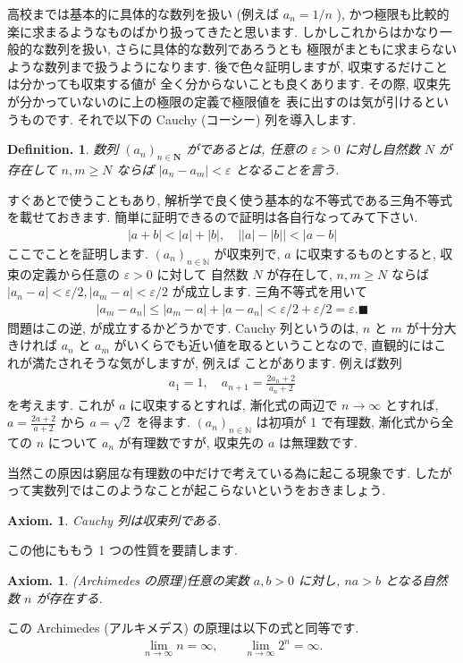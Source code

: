 \documentclass[openany, a4paper, oneside]{jsbook}
\theoremstyle{break}
\newtheorem{axm}[thm]{Axiom.}
\theoremstyle{breakdefn}
\newtheorem{defn}[thm]{Definition.}
\newcommand{\bN}{\mathbb{N}}
\newcommand{\vep}{\varepsilon}
\newcommand{\an}{(a_n)_{n{\in}{\bN}}}
\begin{document}
高校までは基本的に具体的な数列を扱い (例えば $a_n = 1/n$ ),
かつ極限も比較的楽に求まるようなものばかり扱ってきたと思います.
しかしこれからはかなり一般的な数列を扱い, さらに具体的な数列であろうとも
極限がまともに求まらないような数列まで扱うようになります.
後で色々証明しますが, 収束するだけことは分かっても収束する値が
全く分からないことも良くあります.
その際, 収束先が分かっていないのに上の極限の定義で極限値を
表に出すのは気が引けるというものです.
それで以下の Cauchy (コーシー) 列を導入します.
\begin{defn}数列 $(a_n)_{n \in \bm{N}}$ がであるとは,
任意の $\varepsilon >0$ に対し自然数 $N$ が存在して
 $n,m \geq N$ ならば $|a_n - a_m|<\varepsilon$ となることを言う.
\end{defn}
すぐあとで使うこともあり, 解析学で良く使う基本的な不等式である三角不等式を載せておきます.
簡単に証明できるので証明は各自行なってみて下さい.
    \begin{align}
        |a+b|<|a|+|b|,
        \quad
        \bigl | |a|-|b| \bigr | < |a-b|
    \end{align}
ここでことを証明します.
 $\an$ が収束列で,  $a$ に収束するものとすると, 収束の定義から任意の $\vep>0$ に対して
自然数 $N$ が存在して,  $n,m\geq N$ ならば $|a_n-a|<\vep/2,|a_m-a|<\vep/2$ が成立します.
三角不等式を用いて
    \begin{align}
        |a_m - a_n|
        \leq
        |a_m - a | + |a - a_n |
        <\vep/2 + \vep/2
        =
        \vep. \blacksquare
    \end{align}
問題はこの逆, が成立するかどうかです.
Cauchy 列というのは,  $n$ と $m$ が十分大きければ $a_n$ と $a_m$ がいくらでも近い値を取るということなので,
直観的にはこれが満たされそうな気がしますが, 例えば
ことがあります.
例えば数列
    \begin{align}
        a_1=1,
        \quad
        a_{n+1}
        =
        \frac{2a_n+2} {a_n+2}
    \end{align}
を考えます. これが $a$ に収束するとすれば, 漸化式の両辺で $n\to\infty$ とすれば,
 $a=\frac{2a+2}{a+2}$ から $a=\sqrt{2}$ を得ます.
 $\an$ は初項が 1 で有理数, 漸化式から全ての $n$ について $a_n$ が有理数ですが, 収束先の $a$ は無理数です.

当然この原因は窮屈な有理数の中だけで考えている為に起こる現象です.
したがって実数列ではこのようなことが起こらないというをおきましょう.
    \begin{axm}Cauchy 列は収束列である.
    \end{axm}
この他にももう 1 つの性質を要請します.
    \begin{axm}(Archimedes の原理)任意の実数 $a,b>0$ に対し,  $n a>b$ となる自然数 $n$ が存在する.
    \end{axm}
この Archimedes (アルキメデス) の原理は以下の式と同等です.
    \begin{align}
        \lim_{n\to\infty}n=\infty,
        \qquad
        \lim_{n\to\infty}2^n=\infty.
    \end{align}
\end{document}
